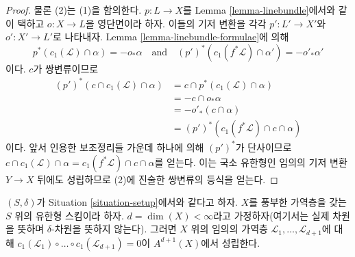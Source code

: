 \begin{proof}
물론 (2)는 (1)을 함의한다. $p : L \to X$를 Lemma
\ref{lemma-linebundle}에서와 같이 택하고 $o : X \to L$을 영단면이라
하자. 이들의 기저 변환을 각각 $p' : L' \to X'$와
$o' : X' \to L'$로 나타내자. Lemma \ref{lemma-linebundle-formulae}에 의해
$$
p^*(c_1(\mathcal{L}) \cap \alpha) = - o_* \alpha
\quad\text{and}\quad
(p')^*(c_1(f^*\mathcal{L}) \cap \alpha') = - o'_* \alpha'
$$
이다. $c$가 쌍변류이므로
\begin{align*}
(p')^*(c \cap c_1(\mathcal{L}) \cap \alpha)
& =
c \cap p^*(c_1(\mathcal{L}) \cap \alpha) \\
& =
- c \cap o_* \alpha \\
& =
- o'_*(c \cap \alpha) \\
& =
(p')^*(c_1(f^*\mathcal{L}) \cap c \cap \alpha)
\end{align*}
이다. 앞서 인용한 보조정리들 가운데 하나에 의해 $(p')^*$가
단사이므로
$c \cap c_1(\mathcal{L}) \cap \alpha =
c_1(f^*\mathcal{L}) \cap c \cap \alpha$를 얻는다. 이는 국소 유한형인
임의의 기저 변환 $Y \to X$ 뒤에도 성립하므로 (2)에 진술한 쌍변류의
등식을 얻는다.
\end{proof}

\begin{lemma}
\label{lemma-vanish-above-dimension}
$(S, \delta)$가 Situation \ref{situation-setup}에서와 같다고 하자.
$X$를 풍부한 가역층을 갖는 $S$ 위의 유한형 스킴이라 하자.
$d = \dim(X) < \infty$라고 가정하자(여기서는 실제 차원을 뜻하며
$\delta$-차원을 뜻하지 않는다). 그러면 $X$ 위의 임의의 가역층
$\mathcal{L}_1, \ldots, \mathcal{L}_{d + 1}$에 대해
$c_1(\mathcal{L}_1) \circ \ldots \circ c_1(\mathcal{L}_{d + 1}) = 0$이
$A^{d + 1}(X)$에서 성립한다.
\end{lemma}

